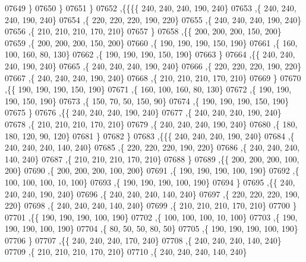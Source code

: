 \begin{DoxyCode}
07649     \}
07650    \}
07651   \}
07652  ,\{\{\{\{   240,   240,   240,   190,   240\}
07653     ,\{   240,   240,   240,   190,   240\}
07654     ,\{   220,   220,   220,   190,   220\}
07655     ,\{   240,   240,   240,   190,   240\}
07656     ,\{   210,   210,   210,   170,   210\}
07657     \}
07658    ,\{\{   200,   200,   200,   150,   200\}
07659     ,\{   200,   200,   200,   150,   200\}
07660     ,\{   190,   190,   190,   150,   190\}
07661     ,\{   160,   100,   160,    80,   130\}
07662     ,\{   190,   190,   190,   150,   190\}
07663     \}
07664    ,\{\{   240,   240,   240,   190,   240\}
07665     ,\{   240,   240,   240,   190,   240\}
07666     ,\{   220,   220,   220,   190,   220\}
07667     ,\{   240,   240,   240,   190,   240\}
07668     ,\{   210,   210,   210,   170,   210\}
07669     \}
07670    ,\{\{   190,   190,   190,   150,   190\}
07671     ,\{   160,   100,   160,    80,   130\}
07672     ,\{   190,   190,   190,   150,   190\}
07673     ,\{   150,    70,    50,   150,    90\}
07674     ,\{   190,   190,   190,   150,   190\}
07675     \}
07676    ,\{\{   240,   240,   240,   190,   240\}
07677     ,\{   240,   240,   240,   190,   240\}
07678     ,\{   210,   210,   210,   170,   210\}
07679     ,\{   240,   240,   240,   190,   240\}
07680     ,\{   180,   180,   120,    90,   120\}
07681     \}
07682    \}
07683   ,\{\{\{   240,   240,   240,   190,   240\}
07684     ,\{   240,   240,   240,   140,   240\}
07685     ,\{   220,   220,   220,   190,   220\}
07686     ,\{   240,   240,   240,   140,   240\}
07687     ,\{   210,   210,   210,   170,   210\}
07688     \}
07689    ,\{\{   200,   200,   200,   100,   200\}
07690     ,\{   200,   200,   200,   100,   200\}
07691     ,\{   190,   190,   190,   100,   190\}
07692     ,\{   100,   100,   100,    10,   100\}
07693     ,\{   190,   190,   190,   100,   190\}
07694     \}
07695    ,\{\{   240,   240,   240,   190,   240\}
07696     ,\{   240,   240,   240,   140,   240\}
07697     ,\{   220,   220,   220,   190,   220\}
07698     ,\{   240,   240,   240,   140,   240\}
07699     ,\{   210,   210,   210,   170,   210\}
07700     \}
07701    ,\{\{   190,   190,   190,   100,   190\}
07702     ,\{   100,   100,   100,    10,   100\}
07703     ,\{   190,   190,   190,   100,   190\}
07704     ,\{    80,    50,    50,    80,    50\}
07705     ,\{   190,   190,   190,   100,   190\}
07706     \}
07707    ,\{\{   240,   240,   240,   170,   240\}
07708     ,\{   240,   240,   240,   140,   240\}
07709     ,\{   210,   210,   210,   170,   210\}
07710     ,\{   240,   240,   240,   140,   240\}

\end{DoxyCode}
